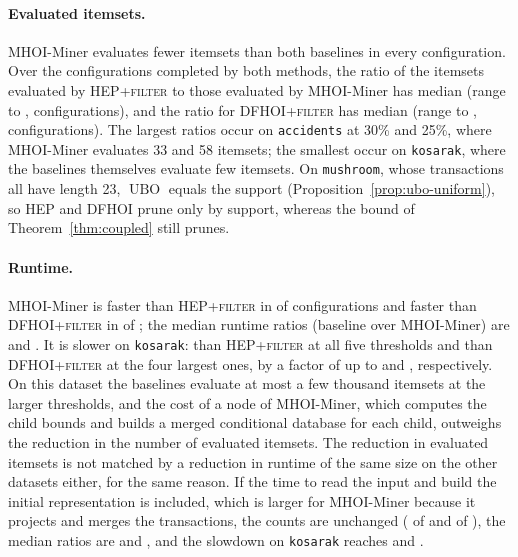 \documentclass[pdflatex,sn-mathphys,Numbered]{sn-jnl}
\theoremstyle{thmstyleone}
\theoremstyle{thmstyletwo}
\theoremstyle{thmstylethree}
\newcommand{\ubo}{\operatorname{UBO}}
\newcommand{\Algo}{MHOI-Miner}
\begin{document}
\paragraph{Evaluated itemsets.}
\Algo{} evaluates fewer itemsets than both baselines in every configuration. Over the configurations completed by both methods, the ratio of the itemsets evaluated by \textsc{HEP+filter} to those evaluated by \Algo{} has median \MedianNodeReductionHep{} (range \MinNodeReductionHep{} to \MaxNodeReductionHep{}, \PairCountHep{} configurations), and the ratio for \textsc{DFHOI+filter} has median \MedianNodeReductionDfhoi{} (range \MinNodeReductionDfhoi{} to \MaxNodeReductionDfhoi{}, \PairCountDfhoi{} configurations). The largest ratios occur on \texttt{accidents} at 30\% and 25\%, where \Algo{} evaluates 33 and 58 itemsets; the smallest occur on \texttt{kosarak}, where the baselines themselves evaluate few itemsets. On \texttt{mushroom}, whose transactions all have length 23, $\ubo$ equals the support (Proposition~\ref{prop:ubo-uniform}), so HEP and DFHOI prune only by support, whereas the bound of Theorem~\ref{thm:coupled} still prunes.

\paragraph{Runtime.}
\Algo{} is faster than \textsc{HEP+filter} in \FasterCountHep{} of \PairCountHep{} configurations and faster than \textsc{DFHOI+filter} in \FasterCountDfhoi{} of \PairCountDfhoi{}; the median runtime ratios (baseline over \Algo{}) are \MedianTimeRatioHep{} and \MedianTimeRatioDfhoi{}. It is slower on \texttt{kosarak}: than \textsc{HEP+filter} at all five thresholds and than \textsc{DFHOI+filter} at the four largest ones, by a factor of up to \MaxSlowdownHep{} and \MaxSlowdownDfhoi{}, respectively. On this dataset the baselines evaluate at most a few thousand itemsets at the larger thresholds, and the cost of a node of \Algo{}, which computes the child bounds and builds a merged conditional database for each child, outweighs the reduction in the number of evaluated itemsets. The reduction in evaluated itemsets is not matched by a reduction in runtime of the same size on the other datasets either, for the same reason. If the time to read the input and build the initial representation is included, which is larger for \Algo{} because it projects and merges the transactions, the counts are unchanged (\FasterEtoECountHep{} of \PairCountHep{} and \FasterEtoECountDfhoi{} of \PairCountDfhoi{}), the median ratios are \MedianEtoERatioHep{} and \MedianEtoERatioDfhoi{}, and the slowdown on \texttt{kosarak} reaches \MaxEtoESlowdownHep{} and \MaxEtoESlowdownDfhoi{}.
\end{document}
